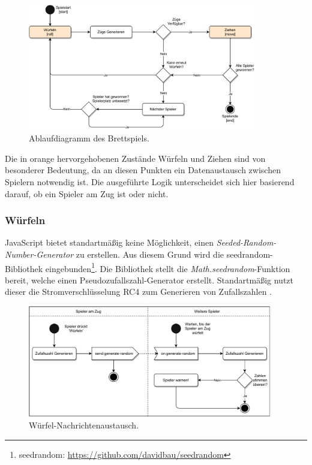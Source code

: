 \begin{figure}[h]
\centering
\includegraphics[width=0.90\textwidth]{bilder/PDF_SVG/MAEDN_ABLAUF.pdf}
\caption{Ablaufdiagramm des Brettspiels.}
\label{fig:maednablauf}
\end{figure}

Die in orange hervorgehobenen Zustände \glqq{}Würfeln\grqq{} und \glqq{}Ziehen\grqq{} sind von besonderer Bedeutung, da an diesen Punkten ein Datenaustausch zwischen Spielern notwendig ist. Die ausgeführte Logik unterscheidet sich hier basierend darauf, ob ein Spieler am Zug ist oder nicht.\par

\subsubsection{Würfeln}
JavaScript bietet standartmäßig keine Möglichkeit, einen \textit{Seeded-Random-Number-Generator} zu erstellen. Aus diesem Grund wird die \glqq{}seedrandom\grqq{}-Bibliothek eingebunden\footnote{seedrandom: \url{https://github.com/davidbau/seedrandom}}. Die Bibliothek stellt die \textit{Math.seedrandom}-Funktion bereit, welche einen Pseudozufallszahl-Generator erstellt. Standartmäßig nutzt dieser die Stromverschlüsselung \acf{RC4} zum Generieren von Zufallszahlen \cite{seedrandom}.

\vspace{6pt}
\begin{figure}[h]
\centering
\includegraphics[width=0.95\textwidth]{bilder/PDF_SVG/MAEDN_WUERFELN.pdf}
\caption{Würfel-Nachrichtenaustausch.}
\label{fig:maednwuerfeln}
\end{figure}

